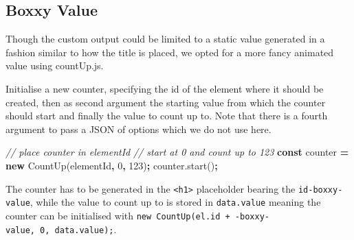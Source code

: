 \documentclass[
  10pt,
]{krantz}
\makeatletter
\newenvironment{Shaded}{\begin{snugshade}}{\end{snugshade}}
\newcommand{\AttributeTok}[1]{\textcolor[rgb]{0.61,0.61,0.61}{#1}}
\newcommand{\CommentTok}[1]{\textcolor[rgb]{0.37,0.37,0.37}{\textit{#1}}}
\newcommand{\DecValTok}[1]{\textcolor[rgb]{0.06,0.06,0.06}{#1}}
\newcommand{\KeywordTok}[1]{\textcolor[rgb]{0.27,0.27,0.27}{\textbf{#1}}}
\newcommand{\NormalTok}[1]{#1}
\newcommand{\OperatorTok}[1]{\textcolor[rgb]{0.43,0.43,0.43}{\textbf{#1}}}
\newcommand{\StringTok}[1]{\textcolor[rgb]{0.5,0.5,0.5}{#1}}
\newcommand{\VariableTok}[1]{\textcolor[rgb]{0,0,0}{#1}}
\newenvironment{kframe}{%
\medskip{}
\setlength{\fboxsep}{.8em}
 \def\at@end@of@kframe{}%
 \ifinner\ifhmode%
  \def\at@end@of@kframe{\end{minipage}}%
  \begin{minipage}{\columnwidth}%
 \fi\fi%
 \def\FrameCommand##1{\hskip\@totalleftmargin \hskip-\fboxsep
 \colorbox{shadecolor}{##1}\hskip-\fboxsep
     \hskip-\linewidth \hskip-\@totalleftmargin \hskip\columnwidth}%
 \MakeFramed {\advance\hsize-\width
   \@totalleftmargin\z@ \linewidth\hsize
   \@setminipage}}%
 {\par\unskip\endMakeFramed%
 \at@end@of@kframe}
\renewenvironment{Shaded}{\begin{kframe}}{\end{kframe}}
\makeatother
\begin{document}
\hypertarget{shiny-output-boxxy-value}{%
\subsection{Boxxy Value}\label{shiny-output-boxxy-value}}

Though the custom output could be limited to a static value generated in a fashion similar to how the title is placed, we opted for a more fancy animated value using countUp.js.

Initialise a new counter, specifying the id of the element where it should be created, then as second argument the starting value from which the counter should start and finally the value to count up to. Note that there is a fourth argument to pass a JSON of options which we do not use here.

\begin{Shaded}
\begin{Highlighting}[]
\CommentTok{// place counter in elementId}
\CommentTok{// start at 0 and count up to 123}
\KeywordTok{const}\NormalTok{ counter }\OperatorTok{=} \KeywordTok{new} \AttributeTok{CountUp}\NormalTok{(}\StringTok{\textquotesingle{}elementId\textquotesingle{}}\OperatorTok{,} \DecValTok{0}\OperatorTok{,} \DecValTok{123}\NormalTok{)}\OperatorTok{;}
\VariableTok{counter}\NormalTok{.}\AttributeTok{start}\NormalTok{()}\OperatorTok{;}
\end{Highlighting}
\end{Shaded}

The counter has to be generated in the \texttt{\textless{}h1\textgreater{}} placeholder bearing the \texttt{id-boxxy-value}, while the value to count up to is stored in \texttt{data.value} meaning the counter can be initialised with \texttt{new\ CountUp(el.id\ +\ \textquotesingle{}-boxxy-value\textquotesingle{},\ 0,\ data.value);}.
\end{document}
